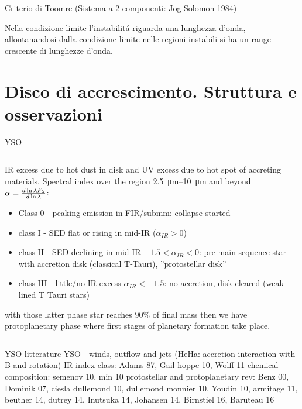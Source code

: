 \begin{wordonframe}{Criterio di Toomre}
(Sistema a 2 componenti: Jog-Solomon 1984)

Nella condizione limite l'instabilit\'a riguarda una lunghezza d'onda, allontanandosi dalla condizione limite nelle regioni instabili si ha un range crescente di lunghezze d'onda.

\end{wordonframe}

\section{Disco di accrescimento. Struttura e osservazioni}

\begin{frame}{YSO}
\begin{columns}[T]\begin{column}{0.65\textwidth}
IR excess due to hot dust in disk and UV excess due to hot spot of accreting materials. Spectral index over the region \SIrange{2.5}{10}{\micro\meter} and beyond $\alpha=\frac{d \ln{\lambda F_{\lambda}}}{d \ln{\lambda}}$: \begin{itemize}
\item Class 0 - peaking emission in FIR/submm: collapse started
\item class I - SED flat or rising in mid-IR ($\alpha_{IR}>0$)
\item class II - SED declining in mid-IR $-1.5<\alpha_{IR}<0$: pre-main sequence star with accretion disk (classical T-Tauri), ''protostellar disk''
\item class III - little/no IR excess $\alpha_{IR}<-1.5$: no accretion, disk cleared (weak-lined T Tauri stars)
\end{itemize}
with those latter phase star reaches $90\%$ of final mass then we have protoplanetary phase where first stages of planetary formation take place.
\end{column}\begin{column}{0.35\textwidth}

\end{column}\end{columns}
\end{frame}

\begin{wordonframe}{YSO litterature}
YSO - winds, outflow and jets (HeHa: accretion interaction with B and rotation)
IR index class: Adams 87, Gail hoppe 10, Wolff 11
chemical composition: semenov 10, min 10
protostellar and protoplanetary rev: Benz 00, Dominik 07, ciesla dullemond 10, dullemond monnier 10, Youdin 10, armitage 11, beuther 14, dutrey 14, Inutsuka 14, Johansen 14, Birnstiel 16, Baruteau 16
\end{wordonframe}

